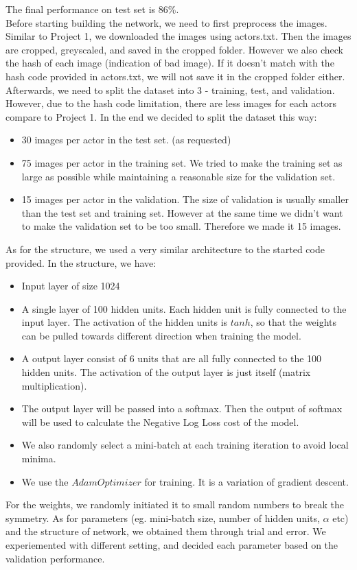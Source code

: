\documentclass[11pt,twoside]{article}
\begin{document}
The final performance on test set is 86\%.\\
Before starting building the network, we need to first preprocess the images. Similar to Project 1, we downloaded the images using actors.txt. Then the images are cropped, greyscaled, and saved in the cropped folder. However we also check the hash of each image (indication of bad image). If it doesn't match with the hash code provided in actors.txt, we will not save it in the cropped folder either.
Afterwards, we need to split the dataset into 3 - training, test, and validation. However, due to the hash code limitation, there are less images for each actors compare to Project 1. In the end we decided to split the dataset this way:
\begin {itemize}
	\item 30 images per actor in the test set. (as requested)
	\item 75 images per actor in the training set. We tried to make the training set as large as possible while maintaining a reasonable size for the validation set.
	\item 15 images per actor in the validation. The size of validation is usually smaller than the test set and training set. However at the same time we didn't want to make the validation set to be too small. Therefore we made it 15 images.
\end {itemize}
As for the structure, we used a very similar architecture to the started code provided. In the structure, we have:
\begin {itemize}
	\item Input layer of size 1024
	\item A single layer of 100 hidden units. Each hidden unit is fully connected to the input layer. The activation of the hidden units is $tanh$, so that the weights can be pulled towards different direction when training the model.
	\item A output layer consist of 6 units that are all fully connected to the 100 hidden units. The activation of the output layer is just itself (matrix multiplication).
	\item The output layer will be passed into a softmax. Then the output of softmax will be used to calculate the Negative Log Loss cost of the model.
	\item We also randomly select a mini-batch at each training iteration to avoid local minima.
	\item We use the $Adam Optimizer$ for training. It is a variation of gradient descent.
\end {itemize}
For the weights, we randomly initiated it to small random numbers to break the symmetry.
As for parameters (eg. mini-batch size, number of hidden units, $\alpha$ etc) and the structure of network, we obtained them through trial and error. We experiemented with different setting, and decided each parameter based on the validation performance.
\end{document}
